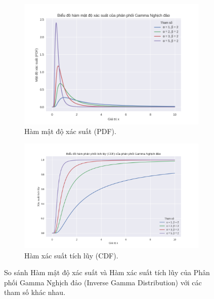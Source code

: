 		\begin{figure}[h!]
		\centering
		
		\begin{subfigure}[b]{0.49\textwidth}
			\centering
			\includegraphics[width=\textwidth]{images/Inverse Gamma Distribution-PDF.png}
			\caption{Hàm mật độ xác suất (PDF).}
			\label{fig:InverseGamma-PDF}
		\end{subfigure}
		\hfill 
		\begin{subfigure}[b]{0.49\textwidth}
			\centering
			\includegraphics[width=\textwidth]{images/Inverse Gamma Distribution-CDF.png}
			\caption{Hàm xác suất tích lũy (CDF).}
			\label{fig:InverseGamma-CDF}
		\end{subfigure}
		
		\caption{So sánh Hàm mật độ xác suất và Hàm xác suất tích lũy của Phân phối Gamma Nghịch đảo (Inverse Gamma Distribution) với các tham số khác nhau.}
		\label{fig:InverseGamma-Combined}
	\end{figure}
